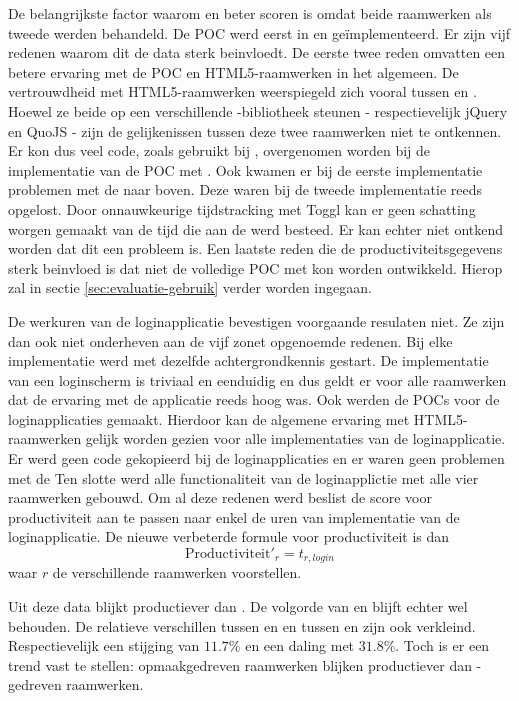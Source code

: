 De belangrijkste factor waarom \lungo{} en \kendo{} beter scoren is omdat beide raamwerken als tweede werden behandeld.
De POC werd eerst in \jqm{} en \st{} geïmplementeerd.
Er zijn vijf redenen waarom dit de data sterk beinvloedt.
De eerste twee reden omvatten een betere ervaring met de POC en HTML5-raamwerken in het algemeen.
De vertrouwdheid met HTML5-raamwerken weerspiegeld zich vooral tussen \jqm{} en \lungo{}.
Hoewel ze beide op een verschillende \js{}-bibliotheek steunen - respectievelijk jQuery en QuoJS - zijn de gelijkenissen tussen deze twee raamwerken niet te ontkennen.
Er kon dus veel code,  zoals gebruikt bij \jqm{},  overgenomen worden bij de implementatie van de POC met \lungo.
Ook kwamen er bij de eerste implementatie problemen met de  naar boven.
Deze waren bij de tweede implementatie reeds opgelost.
Door onnauwkeurige tijdstracking met Toggl kan er geen schatting worgen gemaakt van de tijd die aan de  werd besteed.
Er kan echter niet ontkend worden dat dit een probleem is. %
Een laatste reden die de productiviteitsgegevens sterk beinvloed is dat niet de volledige POC met \lungo{} kon worden ontwikkeld.
Hierop zal in sectie \ref{sec:evaluatie-gebruik} verder worden ingegaan.

De werkuren van de loginapplicatie bevestigen voorgaande resulaten niet.
Ze zijn dan ook niet onderheven aan de vijf zonet opgenoemde redenen.
Bij elke implementatie werd met dezelfde achtergrondkennis gestart.  
De implementatie van een loginscherm is triviaal en eenduidig en dus geldt er voor alle raamwerken dat de ervaring met de applicatie reeds hoog was.
Ook werden de POCs voor de loginapplicaties gemaakt.
Hierdoor kan de algemene ervaring met HTML5-raamwerken gelijk worden gezien voor alle implementaties van de loginapplicatie.
Er werd geen code gekopieerd bij de loginapplicaties en er waren geen problemen met de 
Ten slotte werd alle functionaliteit van de loginapplictie met alle vier raamwerken gebouwd.
Om al deze redenen werd beslist de score voor productiviteit aan te passen naar enkel de uren van implementatie van de loginapplicatie.
De nieuwe verbeterde formule voor productiviteit is dan
\begin{equation}
  \text{Productiviteit}'_r = t_{r,login}
  \label{eq:productiviteit-enhanced}
\end{equation}
waar $r$ de verschillende raamwerken voorstellen.

Uit deze data blijkt \jqm{} productiever dan \lungo{}. 
De volgorde van \kendo{} en \st{} blijft echter wel behouden.
De relatieve verschillen tussen \jqm{} en \lungo{} en tussen \st{} en \kendo{} zijn ook verkleind.  
Respectievelijk een stijging van $11.7\%$ en een daling met $31.8\%$.
Toch is er een trend vast te stellen:  opmaakgedreven raamwerken blijken productiever dan \js-gedreven raamwerken.

